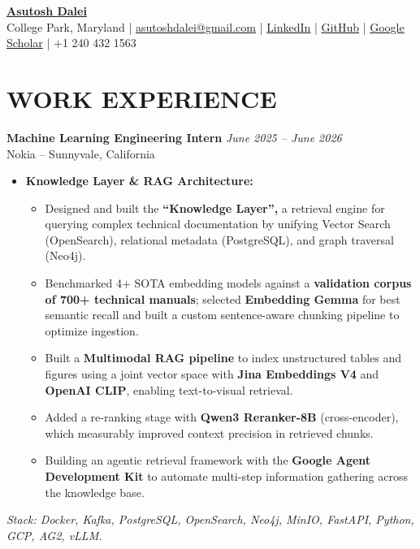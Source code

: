 \documentclass[9pt]{article}
\newcommand{\namesize}{\fontsize{20}{22}\selectfont}
\newcommand{\headersize}{\fontsize{10}{12}\selectfont}
\begin{document}
\pagestyle{empty}

\begin{center}
    {\bfseries \color{black} \namesize
    \href{https://asutoshdalei.github.io/AsutoshDalei/}{Asutosh Dalei}}\\[6pt]
    {\headersize
    College Park, Maryland |
    \href{mailto:asutoshdalei@gmail.com}{asutoshdalei@gmail.com} |
    \href{https://www.linkedin.com/in/asutosh-dalei2212}{LinkedIn} |
    \href{https://github.com/AsutoshDalei}{GitHub} |
    \href{https://scholar.google.com/citations?user=ZTEw6iQAAAAJ&hl=en&oi=sra}{Google Scholar} |
    +1 240 432 1563}
\end{center}
\vspace{-7pt}

\section*{WORK EXPERIENCE}

\textbf{Machine Learning Engineering Intern} \hfill \textit{June 2025 -- June 2026}\\
Nokia -- Sunnyvale, California
\begin{itemize}
    \item \textbf{Knowledge Layer \& RAG Architecture:}
    \begin{itemize}
        \item Designed and built the \textbf{``Knowledge Layer'',} a retrieval engine for querying complex technical documentation by unifying Vector Search (OpenSearch), relational metadata (PostgreSQL), and graph traversal (Neo4j).
        \item Benchmarked 4+ SOTA embedding models against a \textbf{validation corpus of 700+ technical manuals}; selected \textbf{Embedding Gemma} for best semantic recall and built a custom sentence-aware chunking pipeline to optimize ingestion.
        \item Built a \textbf{Multimodal RAG pipeline} to index unstructured tables and figures using a joint vector space with \textbf{Jina Embeddings V4} and \textbf{OpenAI CLIP}, enabling text-to-visual retrieval.
        \item Added a re-ranking stage with \textbf{Qwen3 Reranker-8B} (cross-encoder), which measurably improved context precision in retrieved chunks.
        \item Building an agentic retrieval framework with the \textbf{Google Agent Development Kit} to automate multi-step information gathering across the knowledge base.
    \end{itemize}
\end{itemize}
\textit{Stack: Docker, Kafka, PostgreSQL, OpenSearch, Neo4j, MinIO, FastAPI, Python, GCP, AG2, vLLM.}
\end{document}

